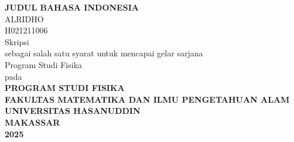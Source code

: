 \begingroup
\fontsize{11pt}{13pt}\selectfont
\begin{center}
  \textbf{JUDUL BAHASA INDONESIA} \\
  \vfill
  ALRIDHO \\
  H021211006 \\
  \vfill
  \begingroup
  \fontsize{10pt}{13pt}\selectfont
  Skripsi \\
  \vspace*{1cm}
  sebagai salah satu syarat untuk mencapai gelar sarjana \\
  \endgroup
  \vspace*{1cm}
  Program Studi Fisika \\
  \vfill
  pada \\
  \vfill
  \textbf{PROGRAM STUDI FISIKA} \\
  \textbf{FAKULTAS MATEMATIKA DAN ILMU PENGETAHUAN ALAM} \\
  \textbf{UNIVERSITAS HASANUDDIN} \\
  \textbf{MAKASSAR} \\
  \textbf{2025}
\end{center}
\endgroup
\restoregeometry
